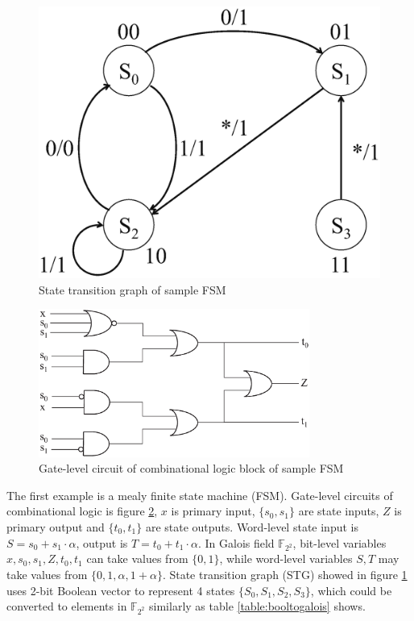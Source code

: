 \begin{figure}[hbt]
\begin{center}
\includegraphics[scale=0.3]{./stg_fig.eps}

\end{center}
\caption{State transition graph of sample FSM}
\label{fig:stg}
\end{figure}

\begin{figure}[hbt]
\begin{center}
\includegraphics[width=3.5in]{./fsm_fig.eps}

\end{center}
\caption{Gate-level circuit of combinational logic block of sample FSM}
\label{fig:fsm}
\end{figure}

The first example is a mealy finite state machine (FSM). Gate-level circuits of combinational logic
is figure \ref{fig:fsm}, $x$ is primary input,
$\{s_0, s_1\}$ are state inputs, $Z$ is primary output and $\{t_0, t_1\}$ are state outputs.
Word-level state input is $S = s_0 + s_1\cdot\alpha$, output is $T = t_0 + t_1\cdot\alpha$. In Galois field
$\mathbb{F}_{2^2}$, bit-level variables $x, s_0, s_1, Z, t_0, t_1$ can take values from $\{0, 1\}$, while
word-level variables $S, T$ may take values from $\{0, 1, \alpha, 1 + \alpha\}$. State transition graph (STG)
showed in figure \ref{fig:stg} uses 2-bit Boolean vector to represent 4 states $\{S_0, S_1, S_2, S_3\}$, which
could be converted to elements in $\mathbb{F}_{2^2}$ similarly as table \ref{table:booltogalois} shows.

